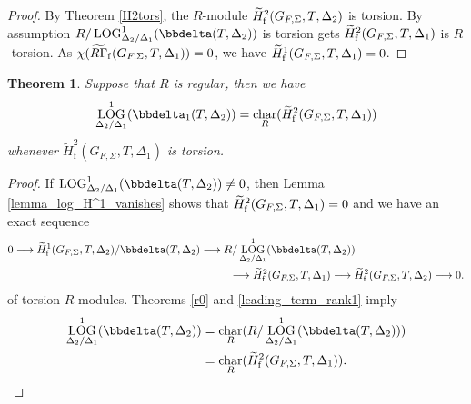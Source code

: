 \documentclass[10pt]{amsart}
\numberwithin{equation}{section}
\newtheorem{thm}{Theorem}[section]
\theoremstyle{definition}
\theoremstyle{remark} %
\DeclareMathOperator{\Char}{char}
\DeclareMathOperator{\LOG}{LOG}
\begin{document}
		\begin{proof}
			By Theorem \ref{H2tors}, the $R$-module $\widetilde{H}^2_{\rm f}(G_{F, \Sigma}, T, \Delta_2)$ is torsion. 
			By assumption $R/\LOG^1_{\Delta_2/\Delta_1}(\bbdelta(T, \Delta_2))$ is torsion gets 
			$\widetilde{H}^2_{\rm f}(G_{F, \Sigma}, T, \Delta_1)$ is $ R $-torsion. 
			As $\chi(\widetilde{R\Gamma}_{\rm f}(G_{F, \Sigma}, T, \Delta_1)) = 0$, we have $\widetilde{H}^1_{\rm f}(G_{F, \Sigma}, T, \Delta_1) = 0$. 
		\end{proof}
		\begin{thm}
			\label{old_log_relation}
			Suppose that $ R $ is regular, then we have 
			$$ \LOG^1_{\Delta_2/\Delta_1} (\bbdelta_1(T, \Delta_2)) = \Char_R(\widetilde{H}^2_{\mathrm{f}}(G_{F,\Sigma},T,\Delta_1)) $$
			whenever $ \widetilde{H}^2_{\mathrm{f}}(G_{F,\Sigma},T,\Delta_1) $ is torsion.
		\end{thm}
		\begin{proof}
			If $\LOG^1_{\Delta_2/\Delta_1}(\bbdelta(T, \Delta_2)) \neq 0$, then Lemma \ref{lemma_log_H^1_vanishes} shows that 
			$\widetilde{H}^2_{\rm f}(G_{F, \Sigma}, T, \Delta_1) = 0$ and we have an exact sequence  
			\begin{align*}
				0 \longrightarrow \widetilde{H}^1_{\rm f}(G_{F, \Sigma}, T, \Delta_2)/\bbdelta(T, \Delta_2)  
				\longrightarrow R/ \LOG^1_{\Delta_2/\Delta_1}(\bbdelta(T, \Delta_2)) \qquad \qquad \qquad \qquad \qquad \\
				\longrightarrow \widetilde{H}^2_{\rm f}(G_{F, \Sigma}, T, \Delta_1)
				\longrightarrow \widetilde{H}^2_{\rm f}(G_{F, \Sigma}, T, \Delta_2) 
				\longrightarrow 0. 
			\end{align*}
			of torsion $R$-modules. Theorems \ref{r0} and \ref{leading_term_rank1}
			imply 
			\begin{align*}
				\LOG^1_{\Delta_2/\Delta_1}(\bbdelta(T, \Delta_2)) &= \Char_R(R/ \LOG^1_{\Delta_2/\Delta_1}(\bbdelta(T, \Delta_2)))
				\\
				&= \Char_R(\widetilde{H}^2_{\rm f}(G_{F, \Sigma}, T, \Delta_1)). 
			\end{align*}	
		\end{proof}
\end{document}
